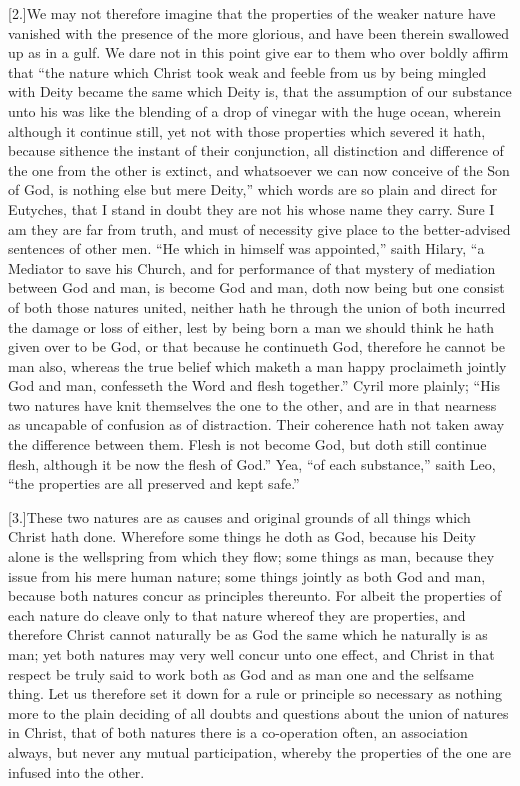 [2.]We may not therefore imagine that the properties of the weaker nature have vanished with the presence of the more glorious, and have been therein swallowed up as in a gulf. We dare not in this point give ear to them who over boldly affirm that “the nature which Christ took weak and feeble from us by being mingled with Deity became the same which Deity is, that the assumption of our substance unto his was like the blending of a drop of vinegar with the huge ocean, wherein although it continue still, yet not with those properties which severed it hath, because sithence the instant of their conjunction, all distinction and difference of the one from the other is extinct, and whatsoever we can now conceive of the Son of God, is nothing else but mere Deity,” which words are so plain and direct for Eutyches, that I stand in doubt they are not his whose name they carry. Sure I am they are far from truth, and must of necessity give place to  the better-advised sentences of other men.
 “He which in himself was appointed,” saith Hilary, “a Mediator to save his Church, and for performance of that mystery of mediation between God and man, is become God and man, doth now being but one consist of both those natures united, neither hath he through the union of both incurred the damage or loss of either, lest by being born a man we should think he hath given over to be God, or that because he continueth God, therefore he cannot be man also, whereas the true belief which maketh a man happy proclaimeth jointly God and man, confesseth the Word and flesh together.” Cyril more plainly; “His two natures have knit themselves the one to the other, and are in that nearness as uncapable of confusion as of distraction. Their coherence hath not taken away the difference between them. Flesh is not become God, but doth still continue flesh, although it be now the flesh of God.” Yea, “of each substance,” saith Leo, “the properties are all preserved and kept safe.”

[3.]These two natures are as causes and original grounds of all things which Christ hath done. Wherefore some things he doth as God, because his Deity alone is the wellspring from which they flow; some things as man, because they issue from his mere human nature; some things jointly as both God and man, because both natures concur as principles thereunto. For albeit the properties of each nature do cleave only to that nature whereof they are properties, and therefore Christ cannot naturally be as God the same which he naturally is as man; yet both natures may very well concur unto one effect, and Christ in that respect be truly said to work  both as God and as man one and the selfsame thing.
 Let us therefore set it down for a rule or principle so necessary as nothing more to the plain deciding of all doubts and questions about the union of natures in Christ, that of both natures there is a co-operation often, an association always, but never any mutual participation, whereby the properties of the one are infused into the other.

